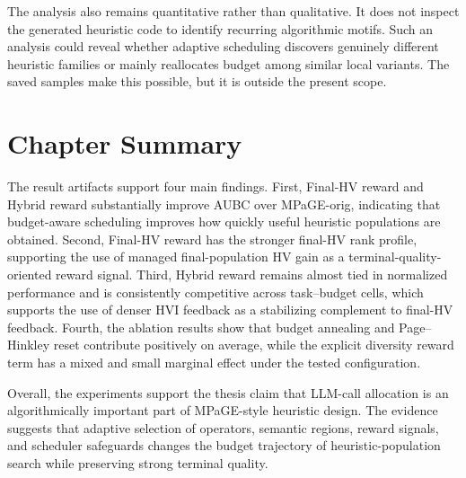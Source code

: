 \documentclass[../main.tex]{subfiles}
\begin{document}
The analysis also remains quantitative rather than qualitative. It does not inspect the generated heuristic code to identify recurring algorithmic motifs. Such an analysis could reveal whether adaptive scheduling discovers genuinely different heuristic families or mainly reallocates budget among similar local variants. The saved samples make this possible, but it is outside the present scope.

\section*{Chapter Summary}

The result artifacts support four main findings. First, Final-HV reward and Hybrid reward substantially improve AUBC over MPaGE-orig, indicating that budget-aware scheduling improves how quickly useful heuristic populations are obtained. Second, Final-HV reward has the stronger final-HV rank profile, supporting the use of managed final-population HV gain as a terminal-quality-oriented reward signal. Third, Hybrid reward remains almost tied in normalized performance and is consistently competitive across task--budget cells, which supports the use of denser HVI feedback as a stabilizing complement to final-HV feedback. Fourth, the ablation results show that budget annealing and Page--Hinkley reset contribute positively on average, while the explicit diversity reward term has a mixed and small marginal effect under the tested configuration.

Overall, the experiments support the thesis claim that LLM-call allocation is an algorithmically important part of MPaGE-style heuristic design. The evidence suggests that adaptive selection of operators, semantic regions, reward signals, and scheduler safeguards changes the budget trajectory of heuristic-population search while preserving strong terminal quality.
\end{document}
